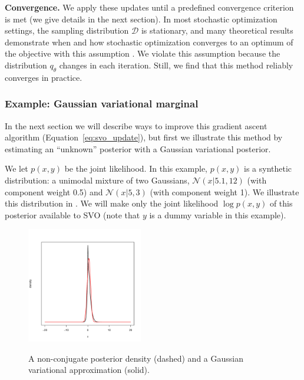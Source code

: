 \textbf{Convergence.} We apply these updates until a predefined
convergence criterion is met (we give details in the next section).
In most stochastic optimization settings, the sampling distribution
$\mathcal{D}$ is stationary, and many theoretical results demonstrate
when and how stochastic optimization converges to an optimum of the
objective with this assumption \cite{bottou:2004,robbins:1951}.  We
violate this assumption because the distribution $q_\theta$ changes in
each iteration.  Still, we find that this method reliably converges in
practice.

\subsubsection{Example: Gaussian variational marginal}
\label{section:gaussian}
In the next section we will describe ways to improve this gradient
ascent algorithm (Equation~\ref{eq:svo_update}), but first we
illustrate this method by estimating an ``unknown'' posterior with a
Gaussian variational posterior.

We let $p(x, y)$ be the joint likelihood. In this example, $p(x, y)$
is a synthetic distribution: a unimodal mixture of two Gaussians,
$\mathcal{N}(x | 5.1, 12)$ (with component weight 0.5) and
$\mathcal{N}(x | 5, 3)$ (with component weight 1).  We illustrate this
distribution in
.  We will make
only the joint likelihood $\log p(x, y)$ of this posterior available
to SVO (note that $y$ is a dummy variable in this example).
\begin{figure}[t!]
  \center
  \vspace{-32pt}
  \includegraphics[width=0.45\textwidth,height=0.21\textheight]{chapter_stochastic_variational_optimization/figures/laplace_approximation.pdf} \\
  \vspace{-20pt}
  \caption{A non-conjugate posterior density (dashed) and a Gaussian
  variational approximation (solid).}
  \label{fig:univariate_comparison_approximation}
\end{figure}

